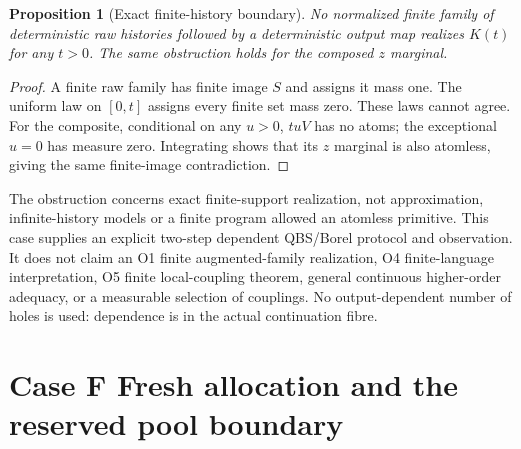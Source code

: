 \documentclass[11pt,a4paper]{article}
\newtheorem{proposition}[theorem]{Proposition}
\theoremstyle{definition}
\begin{document}
\begin{proposition}[Exact finite-history boundary]
No normalized finite family of deterministic raw histories followed by
a deterministic output map realizes $K(t)$ for any $t>0$. The same
obstruction holds for the composed $z$ marginal.
\end{proposition}
\begin{proof}
A finite raw family has finite image $S$ and assigns it mass one.
The uniform law on $[0,t]$ assigns every finite set mass zero.
These laws cannot agree. For the composite, conditional on any $u>0$,
$tuV$ has no atoms; the exceptional $u=0$ has measure zero.
Integrating shows that its $z$ marginal is also atomless, giving the
same finite-image contradiction.
\end{proof}
The obstruction concerns exact finite-support realization, not
approximation, infinite-history models or a finite program allowed an
atomless primitive. This case supplies an explicit two-step dependent
QBS/Borel protocol and observation. It does not claim an O1 finite
augmented-family realization, O4 finite-language interpretation, O5
finite local-coupling theorem, general continuous higher-order adequacy,
or a measurable selection of couplings. No output-dependent number of
holes is used: dependence is in the actual continuation fibre.


\section{Case F Fresh allocation and the reserved pool boundary}\label{sec:caseF}
\end{document}
